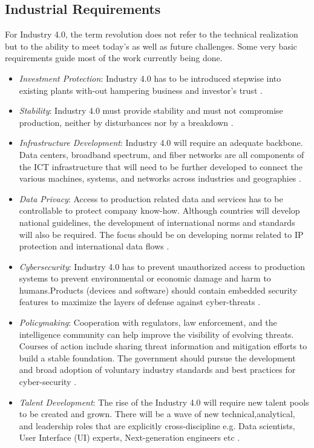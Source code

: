 \subsection{Industrial Requirements}
For Industry 4.0, the term revolution does not refer to the technical realization but to the ability to meet today’s as well as future challenges. Some very basic requirements guide most of the work currently being done.
\begin{itemize}
\item \textit{Investment Protection}: Industry 4.0 has to be introduced stepwise into existing plants with-out hampering business and investor's trust \cite{IN4HYPE,IN4BCG}.
\item \textit{Stability}: Industry 4.0 must provide stability and must not compromise production, neither by disturbances nor by a breakdown \cite{IN4HYPE}.
\item \textit{Infrastructure Development}: Industry 4.0 will require an	adequate backbone. Data centers, broadband spectrum, and fiber networks are all components of the \acs{ICT} infrastructure that will need to be further developed to connect the various machines, systems, and networks across industries and geographies \cite{INDUSINTERNET}.
\item \textit{Data Privacy}: Access to production related data and services has to be controllable to protect company	know-how. Although	countries will develop national guidelines, the development of international norms and	standards will also be required. The focus	should be on developing norms related to IP protection and international data flows \cite{IN4HYPE,INDUSINTERNET}.
\item \textit{Cybersecurity}: Industry 4.0 has to prevent unauthorized access to production systems to prevent environmental or economic damage and harm to humans.Products	(devices and software) should contain embedded security features to maximize the layers of defense against cyber-threats \cite{IN4HYPE,INDUSINTERNET}.
\item \textit{Policymaking}: Cooperation with regulators, law enforcement, and the intelligence community can help improve the visibility of evolving threats. Courses of action include sharing threat information and mitigation efforts to build a stable foundation. The government should pursue the development and broad
adoption of voluntary industry standards and best practices for cyber-security \cite{INDUSINTERNET}.
\item \textit{Talent Development}: The rise of the Industry 4.0 will require new talent pools to be created and grown. There will be a wave of new technical,analytical, and leadership roles that are	explicitly cross-discipline e.g. Data scientists, User Interface (\acs{UI}) experts, Next-generation engineers etc \cite{INDUSINTERNET}.

\end{itemize}
